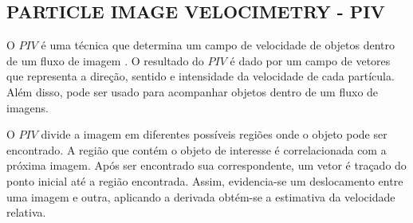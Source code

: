 \subsection{PARTICLE IMAGE VELOCIMETRY - PIV}

O $PIV$ é uma técnica que determina um campo de velocidade de objetos dentro de um fluxo de imagem \cite{Bastiaans}.
O resultado do $PIV$ é dado por um campo de vetores que representa a direção, sentido e intensidade da velocidade de cada 
partícula. Além disso, pode ser usado para acompanhar objetos dentro de um fluxo de imagens.

O $PIV$ divide a imagem em diferentes possíveis regiões onde o objeto pode ser encontrado. A região que contém o objeto de 
interesse é correlacionada com a próxima imagem. Após ser encontrado sua correspondente, um vetor é traçado do ponto inicial
até a região encontrada. Assim, evidencia-se um deslocamento entre uma imagem e outra, aplicando a derivada 
obtém-se a estimativa da velocidade relativa.

